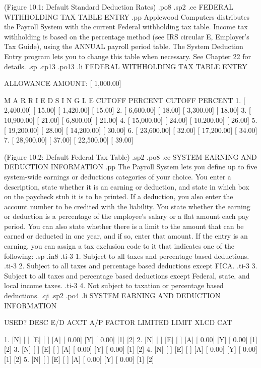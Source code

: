     (Figure 10.1: Default Standard Deduction Rates)
.po8
.sp2
.ce
FEDERAL WITHHOLDING TAX TABLE ENTRY
.pp
Applewood Computers distributes the Payroll System with the current
Federal withholding tax table. Income tax withholding is based on the
percentage method (see IRS circular E, Employer's Tax Guide), using the
ANNUAL payroll period table.  The System Deduction Entry program lets you
to change this table when necessary.  See Chapter 22 for details.
.sp
.cp13
.po13
.li
	      FEDERAL WITHHOLDING TAX TABLE ENTRY

	       ALLOWANCE AMOUNT:  [    1,000.00]

	   M A R R I E D		S I N G L E
	CUTOFF	    PERCENT	    CUTOFF	 PERCENT
1. [   2,400.00] [     15.00]	[   1,420.00] [     15.00]
2. [   6,600.00] [     18.00]	[   3,300.00] [     18.00]
3. [  10,900.00] [     21.00]	[   6,800.00] [     21.00]
4. [  15,000.00] [     24.00]	[  10.200.00] [     26.00]
5. [  19,200.00] [     28.00]	[  14,200.00] [     30.00]
6. [  23,600.00] [     32.00]	[  17,200.00] [     34.00]
7. [  28,900.00] [     37.00]	[  22,500.00] [     39.00]

	   (Figure 10.2: Default Federal Tax Table)
.sp2
.po8
.ce
SYSTEM EARNING AND DEDUCTION INFORMATION
.pp
The Payroll System lets you define up to
five system-wide earnings or deductions categories
of your choice.  You enter a description, state whether it is
an earning or deduction, and state in which box on the paycheck stub it is
to be printed.
If a deduction, you also enter the account number to be
credited with the
liability. You state whether the earning or deduction is a percentage
of the employee's salary or a flat amount each pay period.
You can also state whether there is a limit to the amount that can
be earned or deducted in one year, and if so, enter that amount.
If the entry is an earning, you can assign a tax exclusion code to it that
indicates one of the following:
.sp
.in8
.ti-3
1. Subject to all taxes and percentage based deductions.
.ti-3
2. Subject to all taxes and percentage based deductions except FICA.
.ti-3
3. Subject to all taxes and percentage based deductions
except Federal, state, and local income taxes.
.ti-3
4. Not subject to taxation or percentage based deductions.
.qi
.sp2
.po4
.li
	       SYSTEM EARNING AND DEDUCTION INFORMATION

   USED?    DESC       E/D ACCT A/P  FACTOR   LIMITED  LIMIT   XLCD CAT

1. [N] [	     ] [E] [  ] [A] [	  0.00] [Y] [	  0.00] [1] [2]
2. [N] [	     ] [E] [  ] [A] [	  0.00] [Y] [	  0.00] [1] [2]
3. [N] [	     ] [E] [  ] [A] [	  0.00] [Y] [	  0.00] [1] [2]
4. [N] [	     ] [E] [  ] [A] [	  0.00] [Y] [	  0.00] [1] [2]
5. [N] [	     ] [E] [  ] [A] [	  0.00] [Y] [	  0.00] [1] [2]

